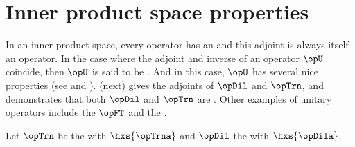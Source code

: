 \section{Inner product space properties}
In an inner product space,
every operator has an  
and this adjoint is always itself an operator.
In the case where the adjoint and inverse of an operator $\opU$ coincide,
then $\opU$ is said to be .
And in this case, $\opU$ has several nice properties (see  and ).
 (next) gives the adjoints of $\opDil$ and $\opTrn$,
and  demonstrates that both
$\opDil$ and $\opTrn$ are .
Other examples of unitary operators include the  $\opFT$
 and the .
\begin{proposition} %
\label{prop:wavstrct_Ta}
\label{prop:wavstrct_Da}
\label{prop:opTa}
Let $\opTrn$ be the   with  $\hxs{\opTrna}$
and $\opDil$    the  with  $\hxs{\opDila}$.
\end{proposition}
